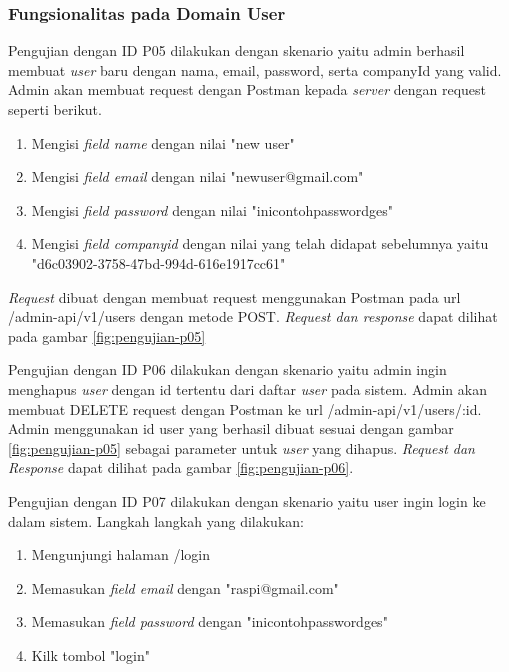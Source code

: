 \subsubsection{Fungsionalitas pada Domain User}

Pengujian dengan ID P05 dilakukan dengan skenario yaitu admin berhasil membuat \textit{user} baru dengan nama, email, password, serta companyId yang valid. Admin akan membuat request dengan Postman kepada \textit{server} dengan request seperti berikut.

\begin{enumerate}
  \item Mengisi \textit{field name} dengan nilai "new user"
  \item Mengisi \textit{field email} dengan nilai "newuser@gmail.com"
  \item Mengisi \textit{field password} dengan nilai "inicontohpasswordges"
  \item Mengisi \textit{field company\textunderscore id} dengan nilai yang telah didapat sebelumnya yaitu "d6c03902-3758-47bd-994d-616e1917cc61"
\end{enumerate}

\textit{Request} dibuat dengan membuat request menggunakan Postman pada url /admin-api/v1/users dengan metode POST. \textit{Request dan response} dapat dilihat pada gambar \ref{fig:pengujian-p05}


Pengujian dengan ID P06 dilakukan dengan skenario yaitu admin ingin menghapus \textit{user} dengan id tertentu dari daftar \textit{user} pada sistem. Admin akan membuat DELETE request dengan Postman ke url /admin-api/v1/users/:id. Admin menggunakan id user yang berhasil dibuat sesuai dengan gambar \ref{fig:pengujian-p05} sebagai parameter untuk \textit{user} yang dihapus. \textit{Request dan Response} dapat dilihat pada gambar \ref{fig:pengujian-p06}.

Pengujian dengan ID P07 dilakukan dengan skenario yaitu user ingin login ke dalam sistem. Langkah langkah yang dilakukan:

\begin{enumerate}
  \item Mengunjungi halaman /login
  \item Memasukan \textit{field email} dengan "raspi@gmail.com"
  \item Memasukan \textit{field password} dengan "inicontohpasswordges"
  \item Kilk tombol "login"
\end{enumerate}

